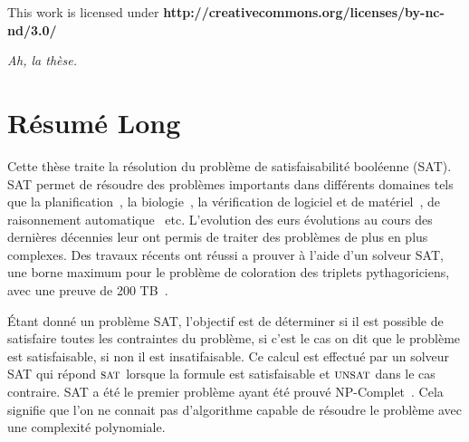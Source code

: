 \clearpage\null\vfill
\thispagestyle{empty}
\begin{minipage}[b]{.9\textwidth}
  \begin{center}
  \setlength{\parskip}{.5\baselineskip}
  {\color{phdcol0}%
   \ccLogo\hspace{.1cm}%
   \ccAttribution\hspace{.1cm}%
   \ccNonCommercial\hspace{.1cm}%
   \ccNoDerivatives}\hspace{.15cm}%
  \footnotesize%
  This work is licensed under {\color{phdcol1}\textbf{http://creativecommons.org/licenses/by-nc-nd/3.0/}}
  \end{center}
\end{minipage}
\vspace*{2\baselineskip}
\clearpage
\thispagestyle{empty}
\begin{flushright}
  \textit{Ah, la thèse.}
\end{flushright}
%
%
%
%

\chapter*{Résumé Long}


Cette thèse traite la résolution du problème de satisfaisabilité booléenne (SAT).
SAT permet de résoudre des problèmes importants dans différents domaines tels 
que la planification~\cite{planning_92}, la biologie~\cite{biology_06}, la vérification de logiciel et de 
matériel~\cite{biere1999symbolic}, de raisonnement automatique~\cite{heule2016solving} etc.
L'evolution des eurs évolutions au cours des dernières décennies leur ont permis de traiter des problèmes de plus en plus complexes.
Des travaux récents ont réussi a prouver à l'aide d'un solveur SAT, une borne maximum
pour le problème de coloration des triplets pythagoriciens, avec une preuve de 200 TB~\cite{heule2016solving}.


Étant donné un problème SAT, l'objectif est de  déterminer si il est possible de satisfaire toutes les contraintes du
problème, si c'est le cas on dit que le problème est satisfaisable, si non il est insatifaisable.
%
Ce calcul est effectué par un solveur SAT qui répond $\textsc{sat}$ lorsque la formule est satisfaisable et $\textsc{unsat}$ dans le cas
contraire. SAT a été le premier problème ayant été prouvé NP-Complet~\cite{cook1971complexity}. Cela signifie que
l'on ne connait pas d'algorithme capable de résoudre le problème avec une complexité polynomiale.


